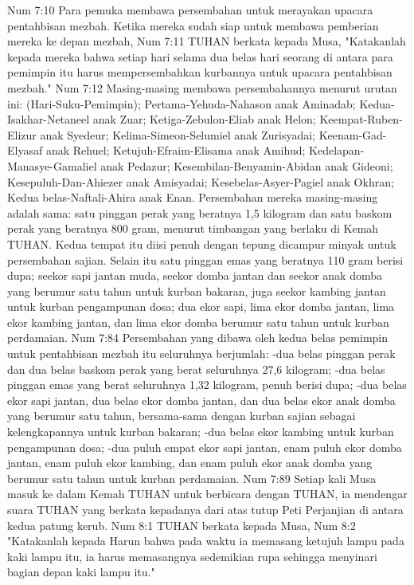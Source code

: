 Num 7:10  Para pemuka membawa persembahan untuk merayakan upacara pentahbisan mezbah. Ketika mereka sudah siap untuk membawa pemberian mereka ke depan mezbah,
Num 7:11  TUHAN berkata kepada Musa, "Katakanlah kepada mereka bahwa setiap hari selama dua belas hari seorang di antara para pemimpin itu harus mempersembahkan kurbannya untuk upacara pentahbisan mezbah."
Num 7:12  Masing-masing membawa persembahannya menurut urutan ini: (Hari-Suku-Pemimpin); Pertama-Yehuda-Nahason anak Aminadab; Kedua-Isakhar-Netaneel anak Zuar; Ketiga-Zebulon-Eliab anak Helon; Keempat-Ruben-Elizur anak Syedeur; Kelima-Simeon-Selumiel anak Zurisyadai; Keenam-Gad-Elyasaf anak Rehuel; Ketujuh-Efraim-Elisama anak Amihud; Kedelapan-Manasye-Gamaliel anak Pedazur; Kesembilan-Benyamin-Abidan anak Gideoni; Kesepuluh-Dan-Ahiezer anak Amisyadai; Kesebelas-Asyer-Pagiel anak Okhran; Kedua belas-Naftali-Ahira anak Enan. Persembahan mereka masing-masing adalah sama: satu pinggan perak yang beratnya 1,5 kilogram dan satu baskom perak yang beratnya 800 gram, menurut timbangan yang berlaku di Kemah TUHAN. Kedua tempat itu diisi penuh dengan tepung dicampur minyak untuk persembahan sajian. Selain itu satu pinggan emas yang beratnya 110 gram berisi dupa; seekor sapi jantan muda, seekor domba jantan dan seekor anak domba yang berumur satu tahun untuk kurban bakaran, juga seekor kambing jantan untuk kurban pengampunan dosa; dua ekor sapi, lima ekor domba jantan, lima ekor kambing jantan, dan lima ekor domba berumur satu tahun untuk kurban perdamaian.
Num 7:84  Persembahan yang dibawa oleh kedua belas pemimpin untuk pentahbisan mezbah itu seluruhnya berjumlah: -dua belas pinggan perak dan dua belas baskom perak yang berat seluruhnya 27,6 kilogram; -dua belas pinggan emas yang berat seluruhnya 1,32 kilogram, penuh berisi dupa; -dua belas ekor sapi jantan, dua belas ekor domba jantan, dan dua belas ekor anak domba yang berumur satu tahun, bersama-sama dengan kurban sajian sebagai kelengkapannya untuk kurban bakaran; -dua belas ekor kambing untuk kurban pengampunan dosa; -dua puluh empat ekor sapi jantan, enam puluh ekor domba jantan, enam puluh ekor kambing, dan enam puluh ekor anak domba yang berumur satu tahun untuk kurban perdamaian.
Num 7:89  Setiap kali Musa masuk ke dalam Kemah TUHAN untuk berbicara dengan TUHAN, ia mendengar suara TUHAN yang berkata kepadanya dari atas tutup Peti Perjanjian di antara kedua patung kerub.
Num 8:1  TUHAN berkata kepada Musa,
Num 8:2  "Katakanlah kepada Harun bahwa pada waktu ia memasang ketujuh lampu pada kaki lampu itu, ia harus memasangnya sedemikian rupa sehingga menyinari bagian depan kaki lampu itu."
